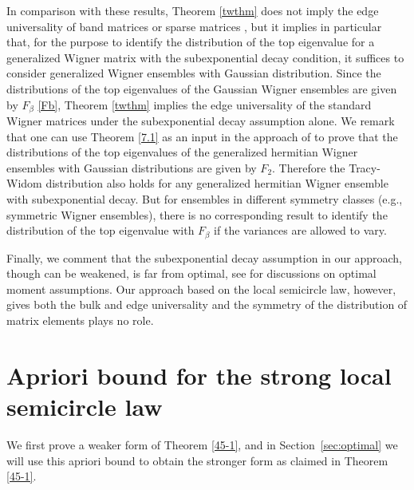 \documentclass[draft]{article}
\numberwithin{equation}{section}
\numberwithin{theorem}{section}
\numberwithin{definition}{section}
\numberwithin{remark}{section}
\begin{document}
 
In comparison with these results,  Theorem 
\ref{twthm} does not imply  the edge universality of band matrices or sparse matrices 
\cite{So1, So2},  but it implies in particular that, for the purpose  to identify 
the distribution of the top 
eigenvalue for a generalized Wigner matrix with the subexponential decay condition, 
it suffices to consider generalized Wigner ensembles with Gaussian distribution. 
Since the distributions 
of the top eigenvalues of the  Gaussian Wigner ensembles 
are given by $F_\beta$ \eqref{Fb},  Theorem 
\ref{twthm} implies  the edge universality of the standard 
Wigner matrices under the subexponential decay assumption alone. 
We remark that one can use Theorem \ref{7.1} as an input
in the approach of \cite{J1} to prove that the distributions of the top eigenvalues of
the generalized hermitian Wigner ensembles with Gaussian distributions  are given by $F_2$.
Therefore the  Tracy-Widom distribution also holds for any generalized hermitian
Wigner ensemble with subexponential decay.
But for ensembles in different symmetry classes (e.g., symmetric Wigner ensembles),
 there is no corresponding  result to identify  the distribution  of the top 
eigenvalue with $F_\beta$ if the variances are allowed to vary. 

Finally, we comment that  the subexponential  decay 
assumption in our approach, though can be weakened, is far from optimal,  
see  \cite{ABP, BBP, Ruz, Sosh2}
for discussions on optimal  moment assumptions.
  Our approach based on the local semicircle law, however,  gives both the bulk and 
edge universality and the symmetry 
of the distribution of matrix elements  plays no role. 

 


\section{Apriori bound for the strong local semicircle law}\label{ld-semi}


  
We first prove a weaker form of Theorem \ref{45-1},
and in Section~\ref{sec:optimal}
we will use this apriori bound to obtain the stronger form
as claimed in  Theorem \ref{45-1}.
\end{document}

